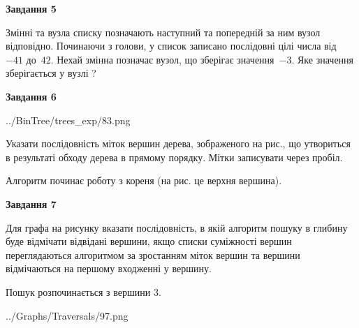 \documentclass[12pt, ukrainian]{article}
\begin{document}
{\begin {large}
{\begin {center}\textbf{Завдання 5}\end {center}}\par
Змінні  та  вузла списку позначають наступний та попередній за ним вузол відповідно. Починаючи з голови, у список записано послідовні цілі числа від~$-41$ до~$42$. Нехай змінна  позначає вузол, що зберігає значення~$-3$.
Яке значення зберігається у вузлі  ?\par
\newpage

{\begin {center}\textbf{Завдання 6}\end {center}}\par

\begin{center}
	{../BinTree/trees_exp/83.png}
\end{center}
Указати послідовність міток вершин дерева, зображеного на рис., що утвориться в результаті обходу дерева в прямому порядку. Мітки записувати через пробіл.\par Алгоритм починає роботу з кореня (на рис. це верхня вершина).\par
\newpage

{\begin {center}\textbf{Завдання 7}\end {center}}\par
Для графа на рисунку вказати послідовність, в якій алгоритм пошуку в глибину буде відмічати відвідані вершини, якщо списки суміжності вершин переглядаються алгоритмом за зростанням міток вершин та вершини відмічаються на першому вход\-женні у вершину.\par
Пошук розпочинається з вершини 3.\par

\begin{center}
	{../Graphs/Traversals/97.png}
\end{center}\par
\newpage


\end{large}}
\end{document}

